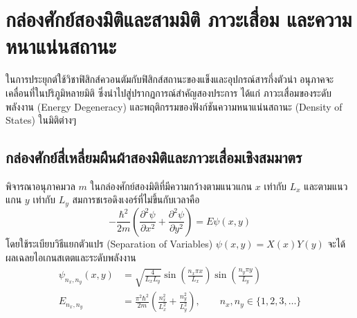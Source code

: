 \section{กล่องศักย์สองมิติและสามมิติ ภาวะเสื่อม และความหนาแน่นสถานะ}
\label{sec_multidimensional_wells}

ในการประยุกต์ใช้วิชาฟิสิกส์ควอนตัมกับฟิสิกส์สถานะของแข็งและอุปกรณ์สารกึ่งตัวนำ อนุภาคจะเคลื่อนที่ในปริภูมิหลายมิติ ซึ่งนำไปสู่ปรากฏการณ์สำคัญสองประการ ได้แก่ ภาวะเสื่อมของระดับพลังงาน (Energy Degeneracy) และพฤติกรรมของฟังก์ชันความหนาแน่นสถานะ (Density of States) ในมิติต่างๆ

\subsection{กล่องศักย์สี่เหลี่ยมผืนผ้าสองมิติและภาวะเสื่อมเชิงสมมาตร}
พิจารณาอนุภาคมวล $m$ ในกล่องศักย์สองมิติที่มีความกว้างตามแนวแกน $x$ เท่ากับ $L_x$ และตามแนวแกน $y$ เท่ากับ $L_y$ สมการชเรอดิงเงอร์ที่ไม่ขึ้นกับเวลาคือ
\begin{equation}
-\frac{\hbar^2}{2m}\left(\frac{\partial^2\psi}{\partial x^2} + \frac{\partial^2\psi}{\partial y^2}\right) = E\psi(x, y)
\end{equation}
โดยใช้ระเบียบวิธีแยกตัวแปร (Separation of Variables) $\psi(x, y) = X(x)Y(y)$ จะได้ผลเฉลยไอเกนสเตตและระดับพลังงาน
\begin{align}
\psi_{n_x, n_y}(x, y) &= \sqrt{\frac{4}{L_x L_y}} \sin\left(\frac{n_x\pi x}{L_x}\right) \sin\left(\frac{n_y\pi y}{L_y}\right) \\
E_{n_x, n_y} &= \frac{\pi^2\hbar^2}{2m}\left(\frac{n_x^2}{L_x^2} + \frac{n_y^2}{L_y^2}\right), \qquad n_x, n_y \in \{1, 2, 3, \dots\}
\end{align}

